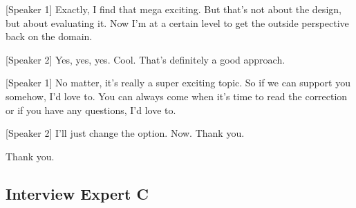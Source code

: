 [Speaker 1]
Exactly, I find that mega exciting. But that's not about the design, but about evaluating it. Now I'm at a certain level to get the outside perspective back on the domain.

[Speaker 2]
Yes, yes, yes. Cool. That's definitely a good approach.

[Speaker 1]
No matter, it's really a super exciting topic. So if we can support you somehow, I'd love to. You can always come when it's time to read the correction or if you have any questions, I'd love to.

[Speaker 2]
I'll just change the option. Now. Thank you.

Thank you.

\subsection{Interview Expert C}\label{int:c}

